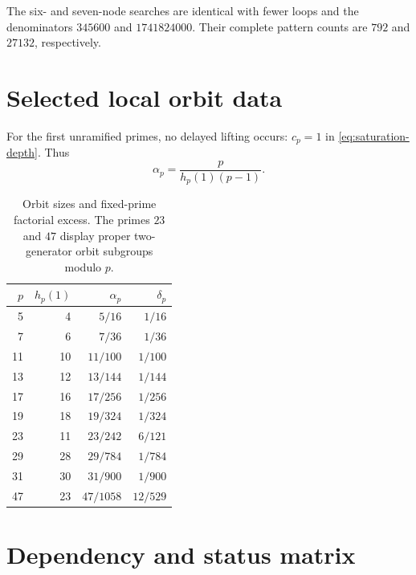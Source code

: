 \documentclass[11pt,oneside]{article}
\theoremstyle{definition}
\theoremstyle{remark}
\begin{document}
The six- and seven-node searches are identical with fewer loops and the denominators
\(345600\) and \(1741824000\).  Their complete pattern counts are \(792\) and \(27132\),
respectively.

\section{Selected local orbit data}
\label{app:orbit-data}

For the first unramified primes, no delayed lifting occurs: \(c_p=1\) in
\eqref{eq:saturation-depth}.  Thus
\[
 \alpha_p=\frac{p}{h_p(1)(p-1)}.
\]

\begin{table}[ht]
\centering
\begin{tabular}{@{}r r r r@{}}
\toprule
\(p\)&\(h_p(1)\)&\(\alpha_p\)&\(\delta_p\)\\
\midrule
5&4&$5/16$&$1/16$\\
7&6&$7/36$&$1/36$\\
11&10&$11/100$&$1/100$\\
13&12&$13/144$&$1/144$\\
17&16&$17/256$&$1/256$\\
19&18&$19/324$&$1/324$\\
23&11&$23/242$&$6/121$\\
29&28&$29/784$&$1/784$\\
31&30&$31/900$&$1/900$\\
47&23&$47/1058$&$12/529$\\
\bottomrule
\end{tabular}
\caption{Orbit sizes and fixed-prime factorial excess.  The primes \(23\) and \(47\) display
proper two-generator orbit subgroups modulo \(p\).}
\label{tab:orbit-data}
\end{table}

\section{Dependency and status matrix}
\label{app:status}
\end{document}
